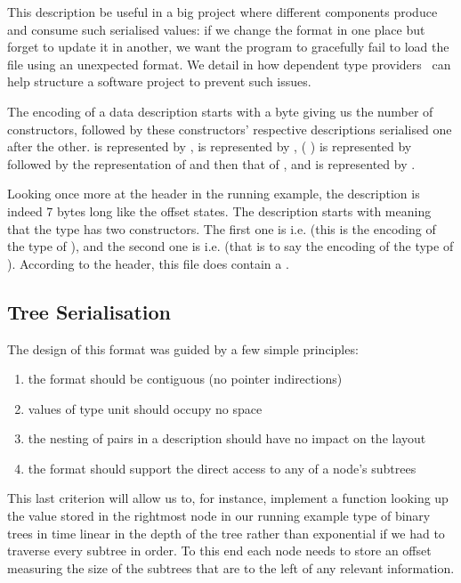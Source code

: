 This description be useful in a big project where different
components produce and consume such serialised values:
if we change the format in one place but forget to update
it in another, we want the program to gracefully
fail to load the file using an unexpected format.
%
We detail in  how dependent
type providers~\citep{DBLP:conf/icfp/Christiansen13}
can help structure a software project
to prevent such issues.

The encoding of a data description starts with a byte giving us the number
of constructors, followed by these constructors' respective descriptions
serialised one after the other.
%
 is represented by ,
 is represented by ,
(  ) is represented by
 followed by the representation of  and then that of ,
and  is represented by .


Looking once more at the header in the running example,
the  description is indeed 7 bytes long like the offset states.
The  description starts with 
meaning that the type has two constructors.
The first one is  i.e. 
(this is the encoding of the type of ),
and the second one is  i.e.
\IdrisKeyword{(} 
\IdrisKeyword{(}  \IdrisKeyword{))}
(that is to say the encoding of the type of ).
%
According to the header, this file does contain a .

\subsection{Tree Serialisation}\label{sec:tree-serialisation}

The design of this format was guided by a few simple principles:
\begin{enumerate}
  \item the format should be contiguous (no pointer indirections)
  \item values of type unit should occupy no space
  \item the nesting of pairs in a description should have no impact on the layout
  \item the format should support the direct access to any of a node's subtrees
\end{enumerate}
%
This last criterion will allow us to, for instance,
implement a function looking up the value stored
in the rightmost node in our running example type
of binary trees in time linear in the depth of the tree
rather than exponential if we had to traverse every subtree in order.
%
To this end each node needs to store an offset measuring the size of the
subtrees that are to the left of any relevant information.

